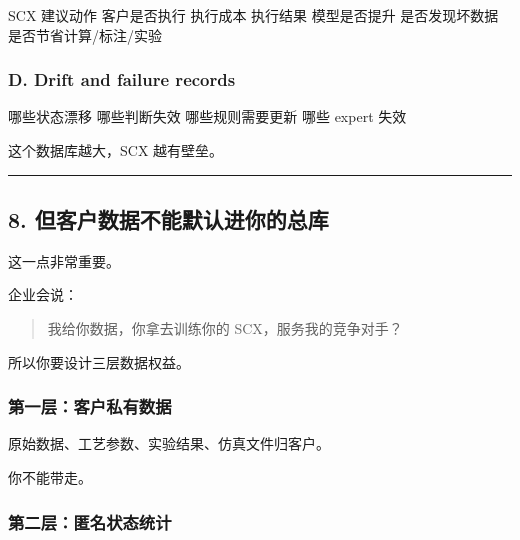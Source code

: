 \documentclass[
  12pt,
]{ctexart}
\newenvironment{Shaded}{}{}
\newcommand{\NormalTok}[1]{#1}
\begin{document}
\begin{Shaded}
\begin{Highlighting}[]
\NormalTok{SCX 建议动作}
\NormalTok{客户是否执行}
\NormalTok{执行成本}
\NormalTok{执行结果}
\NormalTok{模型是否提升}
\NormalTok{是否发现坏数据}
\NormalTok{是否节省计算/标注/实验}
\end{Highlighting}
\end{Shaded}

\subsubsection{D. Drift and failure
records}\label{d.-drift-and-failure-records}

\begin{Shaded}
\begin{Highlighting}[]
\NormalTok{哪些状态漂移}
\NormalTok{哪些判断失效}
\NormalTok{哪些规则需要更新}
\NormalTok{哪些 expert 失效}
\end{Highlighting}
\end{Shaded}

这个数据库越大，SCX 越有壁垒。

\begin{center}\rule{0.5\linewidth}{0.5pt}\end{center}

\subsection{8.
但客户数据不能默认进你的总库}\label{ux4f46ux5ba2ux6237ux6570ux636eux4e0dux80fdux9ed8ux8ba4ux8fdbux4f60ux7684ux603bux5e93}

这一点非常重要。

企业会说：

\begin{quote}
我给你数据，你拿去训练你的 SCX，服务我的竞争对手？
\end{quote}

所以你要设计三层数据权益。

\subsubsection{第一层：客户私有数据}\label{ux7b2cux4e00ux5c42ux5ba2ux6237ux79c1ux6709ux6570ux636e}

原始数据、工艺参数、实验结果、仿真文件归客户。

你不能带走。

\subsubsection{第二层：匿名状态统计}\label{ux7b2cux4e8cux5c42ux533fux540dux72b6ux6001ux7edfux8ba1}
\end{document}
